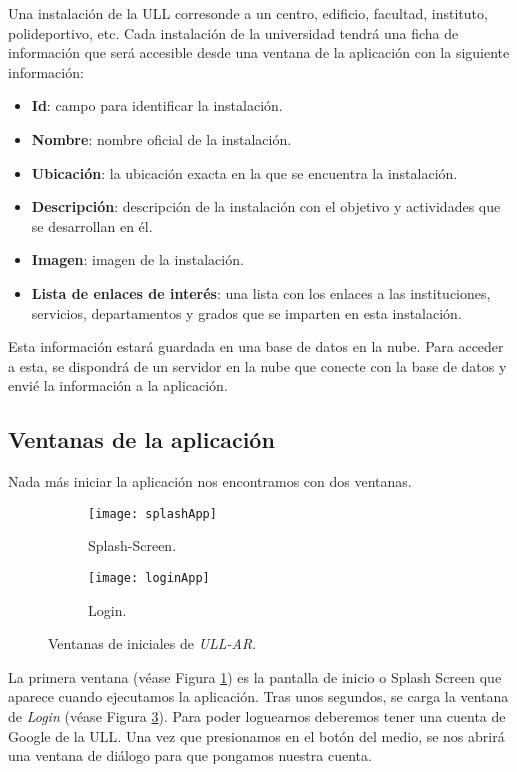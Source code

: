 Una instalación de la ULL corresonde a un centro, edificio, facultad, instituto, polideportivo, etc. Cada instalación de la universidad tendrá una ficha de información que será accesible desde una ventana de la aplicación con la siguiente información:

\begin{itemize}
    \item \textbf{Id}: campo para identificar la instalación.
    \item \textbf{Nombre}: nombre oficial de la instalación.
    \item \textbf{Ubicación}: la ubicación exacta en la que se encuentra la instalación. 
    \item \textbf{Descripción}: descripción de la instalación con el objetivo y actividades que se desarrollan en él.
    \item \textbf{Imagen}: imagen de la instalación.
    \item \textbf{Lista de enlaces de interés}: una lista con los enlaces a las instituciones, servicios, departamentos y grados que se imparten en esta instalación.
\end{itemize}

Esta información estará guardada en una base de datos en la nube. Para acceder a esta, se dispondrá de un servidor en la nube que conecte con la base de datos y envié la información a la aplicación.

\subsection{Ventanas de la aplicación}

Nada más iniciar la aplicación nos encontramos con dos ventanas.

\begin{figure}[h]
\hspace*{\fill}%
\begin{subfigure}[h]{0.32\linewidth}
\texttt{[image: splashApp]}
\caption{Splash-Screen.}
\label{fig:splashApp}
\end{subfigure}
\hfill%
\begin{subfigure}[h]{0.32\linewidth}
\texttt{[image: loginApp]}
\caption{Login.}
\label{fig:loginApp} 
\end{subfigure}%
\caption{Ventanas de iniciales de \textit{ULL-AR}.}
\hspace*{\fill}%
\end{figure}
  
La primera ventana (véase Figura \ref{fig:splashApp}) es la pantalla de inicio o Splash Screen que aparece cuando ejecutamos la aplicación. Tras unos segundos, se carga la ventana de \textit{Login} (véase Figura \ref{fig:loginApp}). Para poder loguearnos deberemos tener una cuenta de Google de la ULL. Una vez que presionamos en el botón del medio, se nos abrirá una ventana de diálogo para que pongamos nuestra cuenta.

